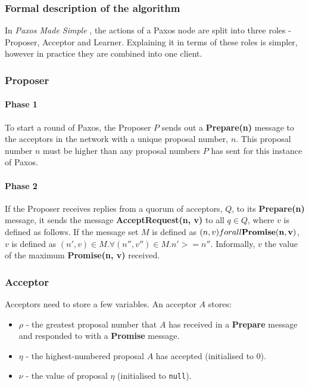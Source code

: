\documentclass[12pt,twoside,notitlepage]{report}
\newcommand{\msg}[1] {{\bf #1}}         %
\begin{document}
\subsubsection*{Formal description of the algorithm}
In \emph{Paxos Made Simple} \cite{lamport01}, the actions of a Paxos node are split into three
roles - Proposer, Acceptor and Learner. Explaining it in terms of these roles is simpler, however
in practice they are combined into one client.

\subsubsection*{Proposer}

\paragraph{Phase 1}

To start a round of Paxos, the Proposer $P$ sends out a \msg{Prepare(n)} message to the acceptors in
the network with a unique proposal number, $n$. This proposal number $n$ must
be higher than any proposal numbers $P$ has sent for this instance of Paxos.

\paragraph{Phase 2}

If the Proposer receives  replies from a quorum of acceptors, $Q$,
to its \msg{Prepare(n)} message, it sends the message \msg{AcceptRequest(n, v)} to all
$q \in Q$, where $v$ is defined as follows. If the message set $M$ is defined as
${(n, v) for all \msg{Promise(n, v)}}$, $v$ is defined as
$(n', v) \in M. \forall (n'', v'') \in M.  n' >= n''$.
Informally, $v$ the value of the maximum \msg{Promise(n, v)} received.

\subsubsection*{Acceptor}

Acceptors need to store a few variables. An acceptor $A$ stores:
\begin{itemize}
\item $\rho$ - the greatest proposal number that $A$ has received in a \msg{Prepare} message and
	responded to with a \msg{Promise} message.
\item $\eta$ - the highest-numbered proposal $A$ has accepted (initialised to $0$).
\item $\nu$ - the value of proposal $\eta$ (initialised to \verb+null+).
\end{itemize}
\end{document}

